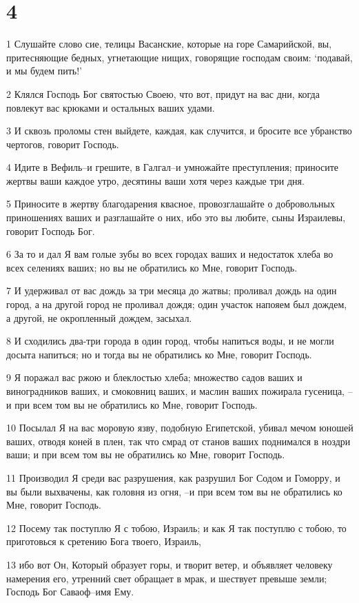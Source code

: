 \chapter{4}

\par 1 Слушайте слово сие, телицы Васанские, которые на горе Самарийской, вы, притесняющие бедных, угнетающие нищих, говорящие господам своим: `подавай, и мы будем пить!'
\par 2 Клялся Господь Бог святостью Своею, что вот, придут на вас дни, когда повлекут вас крюками и остальных ваших удами.
\par 3 И сквозь проломы стен выйдете, каждая, как случится, и бросите все убранство чертогов, говорит Господь.
\par 4 Идите в Вефиль--и грешите, в Галгал--и умножайте преступления; приносите жертвы ваши каждое утро, десятины ваши хотя через каждые три дня.
\par 5 Приносите в жертву благодарения квасное, провозглашайте о добровольных приношениях ваших и разглашайте о них, ибо это вы любите, сыны Израилевы, говорит Господь Бог.
\par 6 За то и дал Я вам голые зубы во всех городах ваших и недостаток хлеба во всех селениях ваших; но вы не обратились ко Мне, говорит Господь.
\par 7 И удерживал от вас дождь за три месяца до жатвы; проливал дождь на один город, а на другой город не проливал дождя; один участок напояем был дождем, а другой, не окропленный дождем, засыхал.
\par 8 И сходились два-три города в один город, чтобы напиться воды, и не могли досыта напиться; но и тогда вы не обратились ко Мне, говорит Господь.
\par 9 Я поражал вас ржою и блеклостью хлеба; множество садов ваших и виноградников ваших, и смоковниц ваших, и маслин ваших пожирала гусеница, --и при всем том вы не обратились ко Мне, говорит Господь.
\par 10 Посылал Я на вас моровую язву, подобную Египетской, убивал мечом юношей ваших, отводя коней в плен, так что смрад от станов ваших поднимался в ноздри ваши; и при всем том вы не обратились ко Мне, говорит Господь.
\par 11 Производил Я среди вас разрушения, как разрушил Бог Содом и Гоморру, и вы были выхвачены, как головня из огня, --и при всем том вы не обратились ко Мне, говорит Господь.
\par 12 Посему так поступлю Я с тобою, Израиль; и как Я так поступлю с тобою, то приготовься к сретению Бога твоего, Израиль,
\par 13 ибо вот Он, Который образует горы, и творит ветер, и объявляет человеку намерения его, утренний свет обращает в мрак, и шествует превыше земли; Господь Бог Саваоф--имя Ему.

